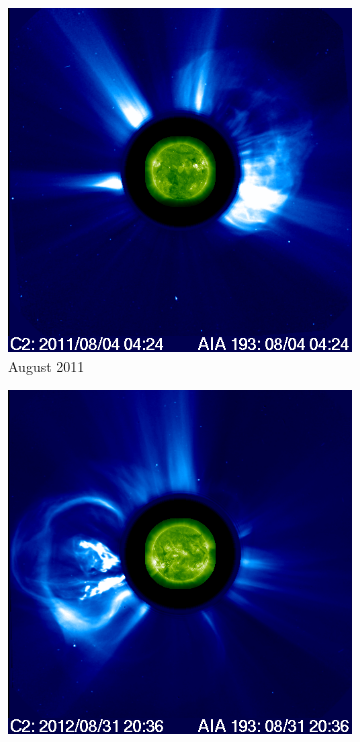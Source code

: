 \message{ !name(main.tex)}\documentclass[12pt]{article}
\begin{document}
\begin{figure}[h!]
    \begin{subfigure}[b]{0.3\textwidth}
        \centering
        \includegraphics[width=\textwidth]{images/soho_cme_aug_04_2011_aia193.png}
        \caption[August  2011 CME]{August  2011}
        \label{fig:soho_cme_aug_04_2011}
    \end{subfigure}
    \hfill
    \begin{subfigure}[b]{0.3\textwidth}
        \includegraphics[width=\textwidth]{images/soho_cme_aug_31_2012_aia193.png}

\end{subfigure}
\end{figure}
\end{document}
